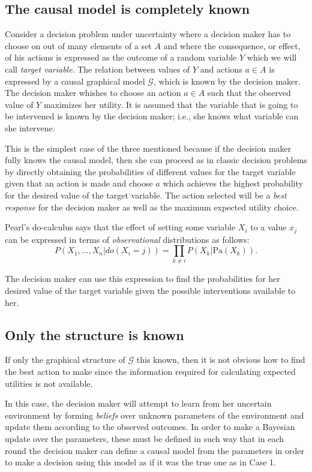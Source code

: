 \documentclass{article}
\begin{document}
\subsection{The causal model is completely known}
Consider a decision problem under uncertainty where a decision maker has to choose on out of many elements of a set $A$ and where the consequence, or effect, of his actions is expressed as the outcome of a random variable $Y$ which we will call \textit{target variable}. The relation between values of $Y$ and actions $a \in A$ is expressed by a causal graphical model $\mathcal{G}$, which is known by the decision maker. The decision maker whishes to choose an action $a \in A$ such that the observed value of $Y$ maximizes her utility. It is assumed that the variable that is going to be intervened is known by the decision maker; i.e., she knows what variable can she intervene.

This is the simplest case of the three mentioned because if the decision maker fully knows the causal model, then she can proceed as in classic decision problems by directly obtaining the probabilities of different values for the target variable given that an action is made and choose $a$ which achieves the highest probability for the desired value of the target variable. The action selected will be a \textit{best response} for the decision maker as well as the maximum expected utility choice.

Pearl's do-calculus \cite{pearl2009causality} says that the effect of setting some variable $X_i$ to a value $x_j$ can be expressed in terms of \textit{observational} distributions as follows:
\[ P(X_1,...,X_n | do(X_i = j )) = \prod_{k \neq i} P(X_k | \textrm{Pa}(X_k)). \]

The decision maker can use this expression to find the probabilities for her desired value of the target variable given the possible interventions available to her.

\subsection{Only the structure is known}
If only the graphical structure of $\mathcal{G}$ this known, then it is not obvious how to find the best action to make since the information required for calculating expected utilities is not available.

In this case, the decision maker will attempt to learn from her uncertain environment by forming \textit{beliefs} over unknown parameters of the environment and update them according to the observed outcomes. In order to make a Bayesian update over the parameters, these must be defined in such way that in each round the decision maker can define a causal model from the parameters in order to make a decision using this model as if it was the true one as in Case 1.
\end{document}

